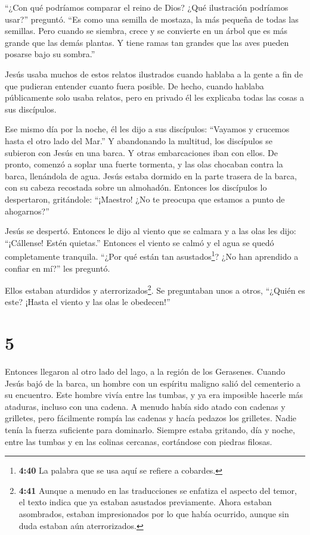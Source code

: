  ``¿Con qué podríamos comparar el reino de Dios? ¿Qué
ilustración podríamos usar?'' preguntó.  ``Es como una
semilla de mostaza, la más pequeña de todas las semillas. 
Pero cuando se siembra, crece y se convierte en un árbol que es más
grande que las demás plantas. Y tiene ramas tan grandes que las aves
pueden posarse bajo su sombra.''

 Jesús usaba muchos de estos relatos ilustrados cuando
hablaba a la gente a fin de que pudieran entender cuanto fuera posible.
 De hecho, cuando hablaba públicamente solo usaba relatos,
pero en privado él les explicaba todas las cosas a sus discípulos.

 Ese mismo día por la noche, él les dijo a sus discípulos:
``Vayamos y crucemos hasta el otro lado del Mar.''  Y
abandonando la multitud, los discípulos se subieron con Jesús en una
barca. Y otras embarcaciones iban con ellos.  De pronto,
comenzó a soplar una fuerte tormenta, y las olas chocaban contra la
barca, llenándola de agua.  Jesús estaba dormido en la
parte trasera de la barca, con su cabeza recostada sobre un almohadón.
Entonces los discípulos lo despertaron, gritándole: ``¡Maestro! ¿No te
preocupa que estamos a punto de ahogarnos?''

 Jesús se despertó. Entonces le dijo al viento que se
calmara y a las olas les dijo: ``¡Cállense! Estén quietas.'' Entonces el
viento se calmó y el agua se quedó completamente tranquila.
 ``¿Por qué están tan asustados\footnote{\textbf{4:40} La
  palabra que se usa aquí se refiere a cobardes.}? ¿No han aprendido a
confiar en mí?'' les preguntó.

 Ellos estaban aturdidos y aterrorizados\footnote{\textbf{4:41}
  Aunque a menudo en las traducciones se enfatiza el aspecto del temor,
  el texto indica que ya estaban asustados previamente. Ahora estaban
  asombrados, estaban impresionados por lo que había ocurrido, aunque
  sin duda estaban aún aterrorizados.}. Se preguntaban unos a otros,
``¿Quién es este? ¡Hasta el viento y las olas le obedecen!''

\hypertarget{section-4}{%
\section{5}\label{section-4}}

 Entonces llegaron al otro lado del lago, a la región de los
Gerasenes.  Cuando Jesús bajó de la barca, un hombre con un
espíritu maligno salió del cementerio a su encuentro.  Este
hombre vivía entre las tumbas, y ya era imposible hacerle más ataduras,
incluso con una cadena.  A menudo había sido atado con
cadenas y grilletes, pero fácilmente rompía las cadenas y hacía pedazos
los grilletes. Nadie tenía la fuerza suficiente para dominarlo.
 Siempre estaba gritando, día y noche, entre las tumbas y en
las colinas cercanas, cortándose con piedras filosas.

